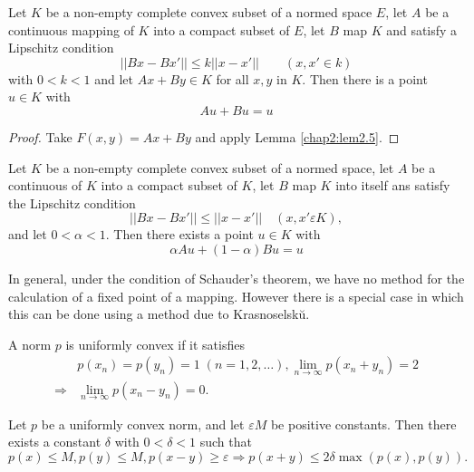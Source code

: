 \begin{thmm}[Kranoselsk\u{u}]%
  Let $K$ be a non-empty complete convex subset of  a normed space
  $E$, let $A$ be a continuous mapping of $K$ into a compact subset of
  $E$, let $B$ map $K$ and satisfy a Lipschitz condition 
  $$
  || Bx - Bx' || \le k || x - x' || \qquad (x, x' \in k)
  $$
  with $0 < k < 1$ and let $Ax + By \in K$ for all $x, y$ in $K$. Then
  there is a point $u \in K$ with 
  $$
  Au + Bu = u
  $$
\end{thmm}

\begin{proof}
  Take $F(x, y) = Ax + By$ and apply Lemma \ref{chap2:lem2.5}.
\end{proof}

\begin{coro*}%
  Let $K$ be a non-empty complete convex subset of a normed space, let
  $A$ be a continuous of $K$ into a compact subset of $K$, let $B$ map
  $K$ into itself ans satisfy the Lipschitz condition 
  $$
  || Bx - Bx' || \le || x - x' || \quad (x, x' \varepsilon K),
  $$
  and let $0 < \alpha < 1$. Then there exists a point $u \in K$ with
  $$
  \alpha Au + (1 - \alpha) Bu = u
  $$ 
\end{coro*}

In general, under the condition of Schauder's theorem, we have no
method for the calculation of a fixed point of a mapping. However
there is a special case in which this can be done using a method due
to Krasnoselsk\u{u}. 

\begin{Definition}%
  A norm $p$ is uniformly convex if it satisfies
  \begin{align*}
  & p (x_n) = p(y_n) = 1\;  (n = 1,2, \ldots), \lim\limits_{n \to \infty} 
  p(x_n + y_n)= 2\\ 
   \Longrightarrow & \lim\limits_{n \to \infty} p (x_n-y_n) =0. 
  \end{align*}\pageoriginale
\end{Definition}

\begin{lemma*}
  Let $p$ be a uniformly convex norm, and let $\varepsilon M$ be positive
  constants. Then there exists a constant $\delta$ with $0 < \delta <
  1$ such that 
  $$
  p(x) \le M, p(y) \le M, p(x - y) \ge \varepsilon \Rightarrow p (x + y) \le 2
  \delta \max (p(x), p (y)). 
  $$
\end{lemma*}

